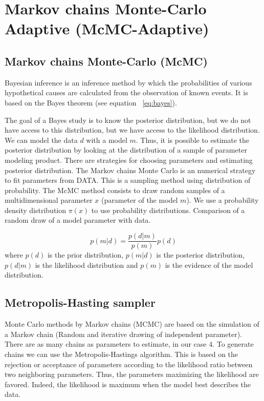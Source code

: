 \documentclass[a4paper,12pt]{article}
\begin{document}
 \section{Markov chains Monte-Carlo Adaptive (McMC-Adaptive)} \label{sc:adap_McMC}
\subsection{Markov chains Monte-Carlo (McMC)}
Bayesian inference is an inference method by which the probabilities of various hypothetical causes are calculated from the observation of known events. It is based on the Bayes theorem (see equation~ \ref{eq:bayes}). 

The goal of a Bayes study is to know the posterior distribution, but we do not have access to this distribution, but we have access to the likelihood distribution. We can model the data $d$ with a model $m$. Thus, it is possible to estimate the posterior distribution by looking at the distribution of a sample of parameter modeling product. There are strategies for choosing parameters and estimating posterior distribution. The Markov chains Monte Carlo is an numerical strategy to fit parameters from DATA. 
This is a sampling method using distribution of probability. The McMC method consists to  draw random samples of a multidimensional parameter $x$ (parameter of the model $m$). We use a probability density distribution $\pi(x)$ to use probability distributions. Comparison of a random draw of a model parameter with data.

\begin{equation}\label{eq:bayes}
    p(m|d) = \frac{p(d|m)}{p(m)}p(d)
\end{equation}
where $p(d)$ is the prior distribution, $p(m|d)$ is the posterior distribution, $p(d|m)$ is the likelihood distribution and $p(m)$ is the evidence of the model distribution. 
\subsection{Metropolis-Hasting sampler}
Monte Carlo methods by Markov chains (MCMC) are based on the simulation of a Markov chain (Random and iterative drawing of
independent parameter). There are as many chains as parameters to estimate, in our case 4. To generate chains we can use the
Metropolis-Hastings algorithm. This is based on the rejection or acceptance of parameters according to the likelihood ratio
between two neighboring parameters. Thus, the parameters maximizing the likelihood are favored. Indeed, the likelihood is
maximum when the model best describes the data. \newline
\end{document}
